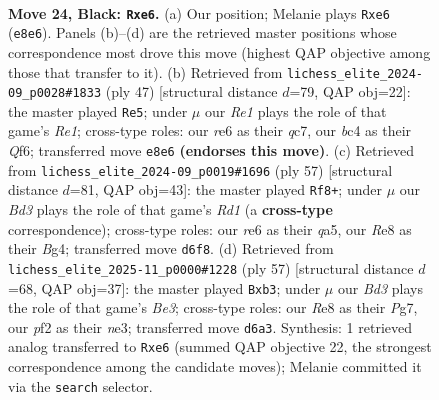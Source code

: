 \documentclass[11pt]{article}
\begin{document}
\clearpage

\begin{figure}[p]\centering
\begin{subfigure}{0.46\textwidth}\centering
\resizebox{\linewidth}{!}{%
\newchessgame
\chessboard[
  setfen={4r1k1/pp5p/3bR1p1/8/2B5/5qP1/PP3P1P/R5K1 b - - 0 24},
  showmover=false,
  pgfstyle=straightmove, color=movearrow, markmove={e8-e6}
]}
\caption{}
\end{subfigure}\hfill
\begin{subfigure}{0.46\textwidth}\centering
\resizebox{\linewidth}{!}{%
\newchessgame
\chessboard[
  setfen={4r1k1/2Q2p2/p1b2qpp/8/1P6/P2B3P/2P2PP1/1R4K1 b - - 0 24},
  showmover=false,
  pgfstyle=straightmove, color=movearrow, markmove={e8-e5}
]}
\caption{}
\end{subfigure}
\\[4pt]
\begin{subfigure}{0.46\textwidth}\centering
\resizebox{\linewidth}{!}{%
\newchessgame
\chessboard[
  setfen={3r2k1/6pp/2p5/Q2p4/3P2b1/P5R1/1P2BKPP/2q5 b - - 6 29},
  showmover=false,
  pgfstyle=straightmove, color=movearrow, markmove={d8-f8}
]}
\caption{}
\end{subfigure}\hfill
\begin{subfigure}{0.46\textwidth}\centering
\resizebox{\linewidth}{!}{%
\newchessgame
\chessboard[
  setfen={8/6pk/p2Rb3/1p3p2/8/1Pq1N1B1/P4PPP/1K6 b - - 1 29},
  showmover=false,
  pgfstyle=straightmove, color=movearrow, markmove={e6-b3}
]}
\caption{}
\end{subfigure}
\caption{\textbf{Move 24, Black: \texttt{Rxe6}.} (a) Our position; Melanie plays \texttt{Rxe6} (\texttt{e8e6}). Panels (b)--(d) are the retrieved master positions whose correspondence most drove this move (highest QAP objective among those that transfer to it). (b) Retrieved from \texttt{lichess\_elite\_2024-09\_p0028\#1833} (ply 47) [structural distance $d$=79, QAP obj=22]: the master played \texttt{Re5}; under $\mu$ our \emph{Re1} plays the role of that game's \emph{Re1}; cross-type roles: our \emph{r}e6 as their \emph{q}c7, our \emph{b}c4 as their \emph{Q}f6; transferred move \texttt{e8e6} \textbf{(endorses this move)}. (c) Retrieved from \texttt{lichess\_elite\_2024-09\_p0019\#1696} (ply 57) [structural distance $d$=81, QAP obj=43]: the master played \texttt{Rf8+}; under $\mu$ our \emph{Bd3} plays the role of that game's \emph{Rd1} (a \textbf{cross-type} correspondence); cross-type roles: our \emph{r}e6 as their \emph{q}a5, our \emph{R}e8 as their \emph{B}g4; transferred move \texttt{d6f8}. (d) Retrieved from \texttt{lichess\_elite\_2025-11\_p0000\#1228} (ply 57) [structural distance $d$=68, QAP obj=37]: the master played \texttt{Bxb3}; under $\mu$ our \emph{Bd3} plays the role of that game's \emph{Be3}; cross-type roles: our \emph{R}e8 as their \emph{P}g7, our \emph{p}f2 as their \emph{n}e3; transferred move \texttt{d6a3}. Synthesis: 1 retrieved analog transferred to \texttt{Rxe6} (summed QAP objective 22, the strongest correspondence among the candidate moves); Melanie committed it via the \texttt{search} selector.}
\label{fig:thought-m47}
\end{figure}
\end{document}
